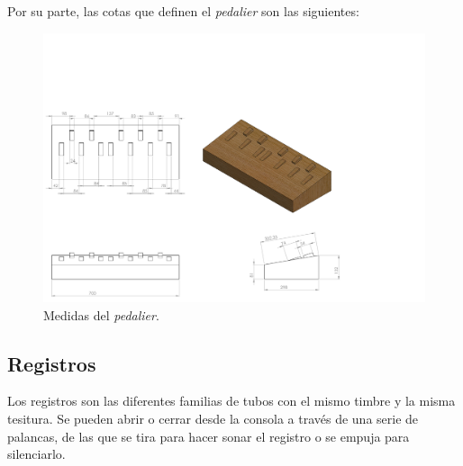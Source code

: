 Por su parte, las cotas que definen el \textit{pedalier} son las siguientes:

\smallskip

\begin{figure}[H]
	\noindent \begin{centering}
		\includegraphics[clip=true,trim=0 0 260 250, width=\linewidth*3/4]{capitulo3/pedalier_modelo}
		\par\end{centering}
	\smallskip
	\caption{\label{fig:pedalier_modelo} Medidas del \textit{pedalier}.}
\end{figure} 

\smallskip

\subsection{Registros}

Los registros son las diferentes familias de tubos con el mismo timbre y la misma tesitura. Se pueden abrir o cerrar desde la consola a través de una serie de palancas, de las que se tira para hacer sonar el registro o se empuja para silenciarlo.

\smallskip

